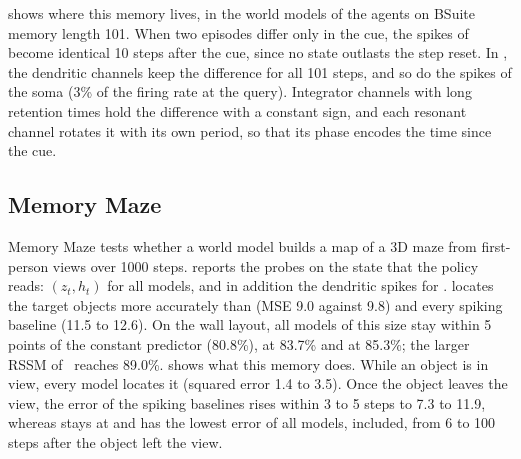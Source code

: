  shows where this memory lives, in the world models of the agents on BSuite memory length 101.
When two episodes differ only in the cue, the spikes of \swm become identical 10 steps after the cue, since no state outlasts the step reset.
In \method, the dendritic channels keep the difference for all 101 steps, and so do the spikes of the soma (3\% of the firing rate at the query).
Integrator channels with long retention times hold the difference with a constant sign, and each resonant channel rotates it with its own period, so that its phase encodes the time since the cue.

\subsection{Memory Maze}
\label{sec:mm}

\begin{table}[t]
  \centering\tabfont
  \setlength{\tabcolsep}{3pt}
  \caption{\textbf{Memory Maze and DMC walker walk.} Memory Maze 9$\times$9 offline probing~\cite{pasukonis2023memorymaze}: probes on the frozen state after 1M updates, second half of the evaluation episodes (constant predictor: 23.9 MSE, 80.8\% walls). Walker walk: return after 500k steps from proprioception and after 1M frames from pixels. \nr: not run. Bottom: reference results from~\cite{pasukonis2023memorymaze} (larger RSSM).}
  \label{tab:mm}
  
\end{table}

Memory Maze tests whether a world model builds a map of a 3D maze from first-person views over 1000 steps.
 reports the probes on the state that the policy reads: $(z_t,h_t)$ for all models, and in addition the dendritic spikes for \method.
\method locates the target objects more accurately than \dv (MSE 9.0 against 9.8) and every spiking baseline (11.5 to 12.6).
On the wall layout, all models of this size stay within 5 points of the constant predictor (80.8\%), \method at 83.7\% and \dv at 85.3\%; the larger RSSM of~\cite{pasukonis2023memorymaze} reaches 89.0\%.
 shows what this memory does.
While an object is in view, every model locates it (squared error 1.4 to 3.5).
Once the object leaves the view, the error of the spiking baselines rises within 3 to 5 steps to 7.3 to 11.9, whereas \method stays at  and has the lowest error of all models, \dv included, from 6 to 100 steps after the object left the view.


